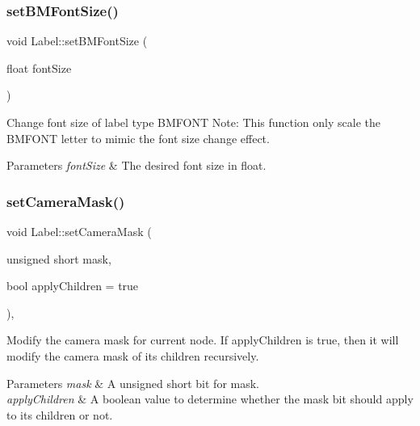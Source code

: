 \subsubsection{\texorpdfstring{set\+B\+M\+Font\+Size()}{setBMFontSize()}\hspace{0.1cm}{\footnotesize\ttfamily [2/2]}}
{\footnotesize\ttfamily void Label\+::set\+B\+M\+Font\+Size (\begin{DoxyParamCaption}\item[{float}]{font\+Size }\end{DoxyParamCaption})}

Change font size of label type B\+M\+F\+O\+NT Note\+: This function only scale the B\+M\+F\+O\+NT letter to mimic the font size change effect.


\begin{DoxyParams}{Parameters}
{\em font\+Size} & The desired font size in float. \\
\hline
\end{DoxyParams}
\mbox{\label{classLabel_a2766bd9d3aa727ee7c50d730af35b9dc}} 
\subsubsection{\texorpdfstring{set\+Camera\+Mask()}{setCameraMask()}\hspace{0.1cm}{\footnotesize\ttfamily [1/2]}}
{\footnotesize\ttfamily void Label\+::set\+Camera\+Mask (\begin{DoxyParamCaption}\item[{unsigned short}]{mask,  }\item[{bool}]{apply\+Children = {\ttfamily true} }\end{DoxyParamCaption})\hspace{0.3cm}{\ttfamily [override]}, {\ttfamily [virtual]}}

Modify the camera mask for current node. If apply\+Children is true, then it will modify the camera mask of its children recursively. 
\begin{DoxyParams}{Parameters}
{\em mask} & A unsigned short bit for mask. \\
\hline
{\em apply\+Children} & A boolean value to determine whether the mask bit should apply to its children or not. \\
\hline
\end{DoxyParams}



